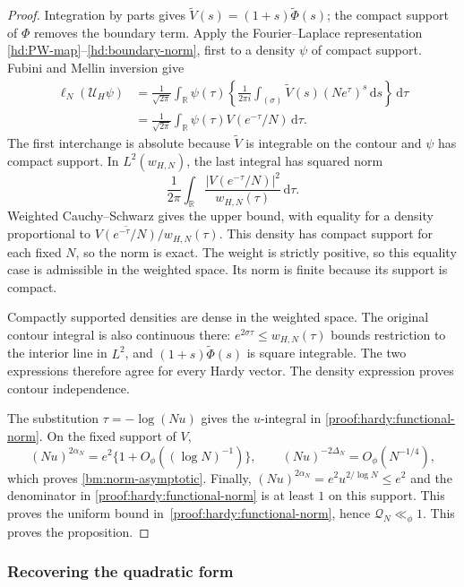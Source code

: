 \documentclass[12pt,a4paper]{amsart}
\numberwithin{equation}{section}
\def\le{\leqslant}
\theoremstyle{plain}
\theoremstyle{definition}
\theoremstyle{remark}
\begin{document}
\begin{proof}
Integration by parts gives
$\widetilde V(s)=(1+s)\widetilde\Phi(s)$; the compact support of
$\Phi$ removes the boundary term.
Apply the Fourier--Laplace representation
\eqref{hd:PW-map}--\eqref{hd:boundary-norm}, first to a density
$\psi$ of compact support. Fubini and Mellin inversion give
\[
 \begin{aligned}
 \ell_N(\mathcal U_H\psi)
 &=\frac1{\sqrt{2\pi}}\int_{\mathbb R}\psi(\tau)
   \left\{\frac1{2\pi i}\int_{(\sigma)}
        \widetilde V(s)(Ne^\tau)^s\,\mathrm{d}s\right\}\,\mathrm{d}\tau\\
 &=\frac1{\sqrt{2\pi}}\int_{\mathbb R}
        \psi(\tau)V(e^{-\tau}/N)\,\mathrm{d}\tau.
 \end{aligned}
\]
The first interchange is absolute because $\widetilde V$ is integrable
on the contour and $\psi$ has compact support. In $L^2(w_{H,N})$,
the last integral has squared norm
\[
 \frac1{2\pi}\int_{\mathbb R}
        \frac{|V(e^{-\tau}/N)|^2}{w_{H,N}(\tau)}\,\mathrm{d}\tau.
\]
Weighted Cauchy--Schwarz gives the upper bound, with equality for a
density proportional to
$\overline{V(e^{-\tau}/N)}/w_{H,N}(\tau)$. This density has compact
support for each fixed $N$, so the norm is exact.
The weight is strictly positive, so this equality case is admissible
in the weighted space. Its norm is finite because its support is compact.

Compactly supported densities are dense in the weighted space.
The original contour integral is also continuous there:
$e^{2\sigma\tau}\le w_{H,N}(\tau)$ bounds restriction to the
interior line in $L^2$, and $(1+s)\widetilde\Phi(s)$ is square
integrable. The two expressions therefore agree for every Hardy
vector. The density expression proves contour independence.

The substitution $\tau=-\log(Nu)$ gives the $u$-integral in
\eqref{proof:hardy:functional-norm}. On the fixed support of $V$,
\[
 (Nu)^{2\alpha_N}
 =e^2\{1+O_\phi((\log N)^{-1})\},\qquad
 (Nu)^{-2\Delta_N}=O_\phi(N^{-1/4}),
\]
which proves \eqref{bm:norm-asymptotic}. Finally,
$(Nu)^{2\alpha_N}=e^2u^{2/\log N}\le e^2$ and the denominator in
\eqref{proof:hardy:functional-norm} is at least $1$ on this support.
This proves the uniform bound in~\eqref{proof:hardy:functional-norm},
hence $\mathcal Q_N\ll_\phi1$.
This proves the proposition.
\end{proof}

\subsubsection{Recovering the quadratic form}
\end{document}

